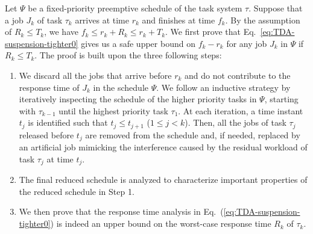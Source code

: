 


Let $\Psi$ be a fixed-priority preemptive schedule of the task system $\tau$.
Suppose that a job $J_{k}$ of task $\tau_k$ arrives at time $r_k$ and finishes at time $f_k$. 
By the assumption of $R_k \leq T_k$, we have $f_k \leq r_k+R_k \leq r_k+T_k$.
We first prove that Eq.~\eqref{eq:TDA-suspension-tighter0} gives us a
safe upper bound on $f_k-r_k$ for any job $J_k$ in $\Psi$ if $R_k \leq
T_k$.
The proof is built upon the three following steps:
\begin{enumerate}
\item We discard all the jobs that arrive before $r_k$ and do not contribute to the response time of $J_k$ in the schedule $\Psi$. We follow an inductive strategy by iteratively inspecting the schedule of the higher priority tasks in $\Psi$, starting with $\tau_{k-1}$ until the highest priority task $\tau_1$. At each iteration, a time instant $t_j$ is identified such that $t_j \leq t_{j+1}$ ($1 \leq j < k$). Then, all the jobs of task $\tau_j$ released before $t_j$ are removed from the schedule and, if needed, replaced by an artificial job mimicking the interference caused by the residual workload of task $\tau_j$ at time $t_j$. %
\item The final reduced schedule is analyzed to characterize important properties of the reduced schedule in Step 1.
\item We then prove that the response time analysis in Eq.~(\ref{eq:TDA-suspension-tighter0}) is indeed an upper bound on the worst-case response time $R_k$ of $\tau_k$.
\end{enumerate}


